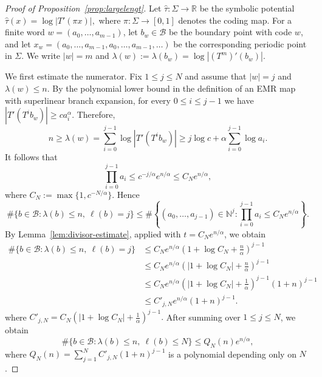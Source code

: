 \documentclass[letterpaper,11pt]{amsart}
\numberwithin{equation}{section}     %
\def\le{\leqslant}
\def\ge{\geqslant}
\begin{document}
\begin{proof}[Proof of Proposition~\ref{prop:largelengt}]
Let $\widehat\tau:\Sigma\to\mathbb R$ be the symbolic potential $\widehat\tau(x)=\log |T'(\pi x)|,$
where $\pi:\Sigma\to[0,1]$ denotes the coding map. For a finite word
$w=(a_0,\ldots,a_{m-1})$, let $b_w\in\mathcal B$ be the boundary point
with code $w$, and let
$x_w=(a_0,\ldots,a_{m-1},a_0,\ldots,a_{m-1},\ldots)$
be the corresponding periodic point in $\Sigma$. We write $|w|=m$ and $\lambda(w):=\lambda(b_w)=\log |(T^m)'(b_w)|.$

We first estimate the numerator. Fix $1\le j\le N$ and assume that
$|w|=j$ and $\lambda(w)\le n$. By the polynomial lower bound in the definition of an EMR map with superlinear branch expansion, for every $ 0\le i\le j-1$ we have $|T'(T^i b_w)|\ge c a_i^\alpha$.
Therefore,
\[
n\ge \lambda(w)
=\sum_{i=0}^{j-1}\log |T'(T^i b_w)|
\ge j\log c+\alpha\sum_{i=0}^{j-1}\log a_i .
\]
It follows that
\[
\prod_{i=0}^{j-1}a_i
\le c^{-j/\alpha}e^{n/\alpha}
\le C_Ne^{n/\alpha},
\]
where $C_N:=\max\{1,c^{-N/\alpha}\}$. Hence
\[
\#\{b\in\mathcal B:\lambda(b)\le n,\ \ell(b)=j\}
\le
\#\left\{(a_0,\ldots,a_{j-1})\in\mathbb N^j:
\prod_{i=0}^{j-1}a_i\le C_Ne^{n/\alpha}\right\}.
\]
By Lemma~\ref{lem:divisor-estimate}, applied with $t=C_Ne^{n/\alpha}$, we obtain
\[
\begin{aligned}
\#\{b\in\mathcal B:\lambda(b)\le n,\ \ell(b)=j\}
&\le  C_N e^{n/\alpha}
   \left(1+\log C_N+\frac{n}{\alpha}\right)^{j-1} \\
&\le  C_N e^{n/\alpha}
   \left(|1+\log C_N|+\frac{n}{\alpha}\right)^{j-1} \\
&\le  C_N e^{n/\alpha}
   \left(|1+\log C_N|+\frac{1}{\alpha}\right)^{j-1}(1+n)^{j-1}
\\
&\le  C'_{j,N} e^{n/\alpha}(1+n)^{j-1}.
\end{aligned}
\]
where $C'_{j,N}= C_N \left(|1+\log C_N|+\frac{1}{\alpha}\right)^{j-1}.$ After summing over $1\le j\le N$, we obtain
\begin{equation}\label{eq:fixed-length-upper}
\#\{b\in\mathcal B:\lambda(b)\le n,\ \ell(b)\le N\}
\le Q_N(n)e^{n/\alpha},
\end{equation}
where $Q_N(n)=\sum_{j=1}^N C'_{j,N}(1+n)^{j-1}$ is a polynomial depending only on $N$.



  


\end{proof}
\end{document}
